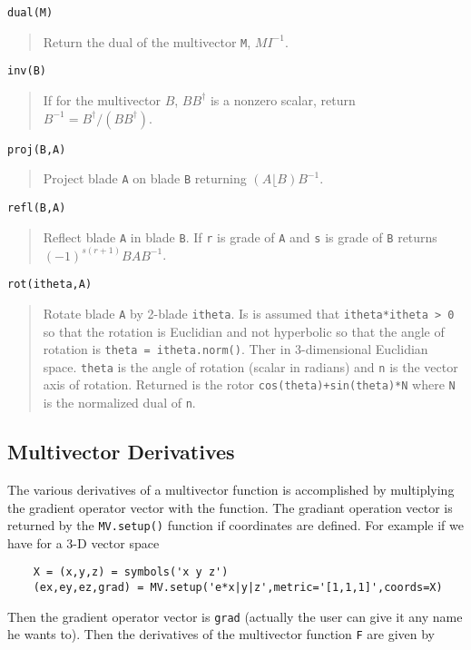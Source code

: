 \documentclass[10pt]{article}
\newcommand{\lp}{\left (}
\newcommand{\rp}{\right )}
\newcommand{\R}{\dagger}
\newcommand{\paren}[1]{\lp {#1} \rp}
\newcommand{\T}[1]{\texttt{#1}}
\begin{document}
\T{dual(M)}
\begin{quote}
   Return the dual of the multivector \T{M}, $MI^{-1}$.
\end{quote}
\T{inv(B)}
\begin{quote}
   If for the multivector $B$, $BB^{\R}$ is a nonzero scalar, return $B^{-1} = B^{\R}/(BB^{\R})$.
\end{quote}
\T{proj(B,A)}
\begin{quote}
   Project blade \T{A} on blade \T{B} returning $\paren{A\lfloor B}B^{-1}$.
\end{quote}
\T{refl(B,A)}
\begin{quote}
   Reflect blade \T{A} in blade \T{B}. If \T{r} is grade of \T{A} and \T{s} is grade of \T{B}
   returns $(-1)^{s(r+1)}BAB^{-1}$.
\end{quote}
\T{rot(itheta,A)}
\begin{quote}
   Rotate blade \T{A} by 2-blade \T{itheta}.  Is is assumed that \T{itheta*itheta > 0} so that
   the rotation is Euclidian and not hyperbolic so that the angle of
   rotation is \T{theta = itheta.norm()}.  Ther in 3-dimensional Euclidian space. \T{theta} is the angle of rotation (scalar in radians) and
   \T{n} is the vector axis of rotation.  Returned is the rotor \T{cos(theta)+sin(theta)*N} where \T{N} is
   the normalized dual of \T{n}.
\end{quote}

\subsection{Multivector Derivatives}

The various derivatives of a multivector function is accomplished by
multiplying the gradient operator vector with the function.  The gradiant
operation vector is returned by the \T{MV.setup()} function if coordinates
are defined.  For example if we have for a 3-D vector space

\begin{lstlisting}
    X = (x,y,z) = symbols('x y z')
    (ex,ey,ez,grad) = MV.setup('e*x|y|z',metric='[1,1,1]',coords=X)
\end{lstlisting}

Then the gradient operator vector is \T{grad} (actually the user can give
it any name he wants to).  Then the derivatives of the multivector
function \T{F} are given by
\end{document}
